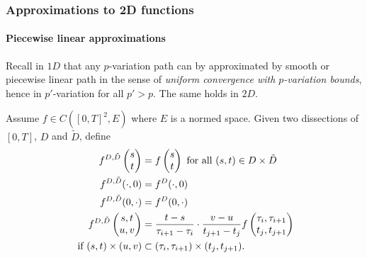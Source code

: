 \subsubsection{Approximations to 2D functions}

\paragraph{Piecewise linear approximations}

Recall in $1D$ that any $p$-variation path can by approximated by smooth or piecewise linear path in the sense of \textit{uniform convergence with $p$-variation bounds}, hence in $p'$-variation for all $p' > p$.
The same holds in $2D$.

\begin{definition}
    Assume $f \in C([0,T]^2,E)$ where $E$ is a normed space. Given two dissections of $[0,T]$, $D$ and $\tilde{D}$, define
    \begin{align}
        f^{D,\tilde{D}} \begin{pmatrix} s \\ t \end{pmatrix} &= f \begin{pmatrix} s \\ t \end{pmatrix} \text{ for all } (s,t) \in D \times \tilde{D} \\
        f^{D,\tilde{D}} (\cdot,0) &= f^D(\cdot, 0) \\
        f^{D,\tilde{D}} (0, \cdot) &= f^D(0, \cdot) \\
        f^{D,\tilde{D}} \begin{pmatrix} s,t \\ u,v \end{pmatrix} &= \frac{t - s}{\tau_{i+1} - \tau_i} \cdot \frac{v - u}{t_{j+1} - t_j} f \begin{pmatrix} \tau_i, \tau_{i+1} \\ t_j, t_{j+1} \end{pmatrix} \\
        \text{ if } (s,t) \times (u,v) &\subset (\tau_i, \tau_{i+1}) \times (t_j, t_{j+1}).
    \end{align}
\end{definition}

